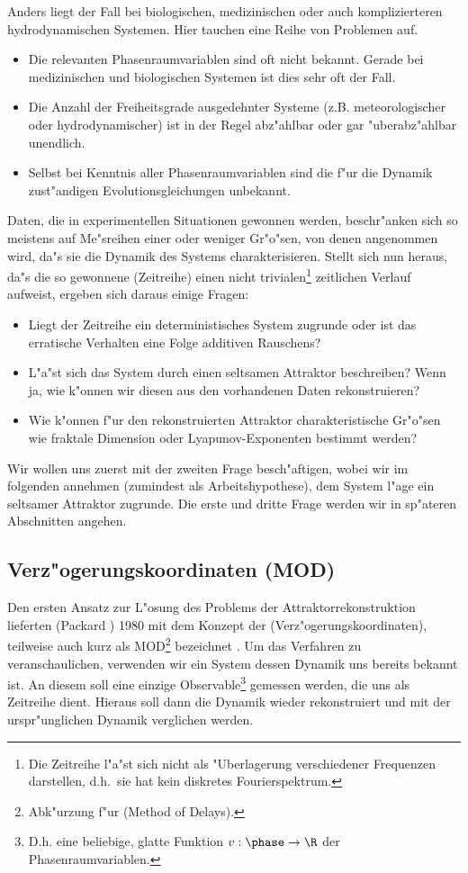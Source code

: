 Anders liegt der Fall bei biologischen, medizinischen oder auch komplizierteren
hydrodynamischen Systemen. Hier tauchen eine Reihe von Problemen auf.
\begin{itemize}
\item Die relevanten Phasenraumvariablen sind oft nicht bekannt. Gerade bei
medizinischen und biologischen Systemen ist dies sehr oft der Fall.
\item Die Anzahl der Freiheitsgrade ausgedehnter Systeme (z.B. meteorologischer oder
hydrodynamischer) ist in der Regel abz"ahlbar oder gar "uberabz"ahlbar unendlich. 
\item Selbst bei Kenntnis aller Phasenraumvariablen sind die f"ur die Dynamik zust"andigen
Evolutionsgleichungen unbekannt.
\end{itemize}
Daten, die in experimentellen Situationen gewonnen werden, beschr"anken sich so meistens
auf Me"sreihen einer oder weniger Gr"o"sen, von denen angenommen wird, da"s  sie die
Dynamik des Systems charakterisieren. Stellt sich nun heraus, da"s die so gewonnene
\begriff(Zeitreihe) einen nicht trivialen\footnote{Die Zeitreihe l"a"st sich nicht als
"Uberlagerung verschiedener Frequenzen darstellen, d.h.\ sie hat kein diskretes
Fourierspektrum.} zeitlichen Verlauf aufweist, ergeben sich daraus einige Fragen:
\begin{itemize}
\item Liegt der Zeitreihe ein deterministisches System zugrunde oder ist das erratische
Verhalten eine Folge additiven Rauschens?
\item L"a"st sich das System durch einen seltsamen Attraktor beschreiben? Wenn ja, wie
k"onnen wir diesen aus den vorhandenen Daten rekonstruieren?
\item Wie k"onnen f"ur den rekonstruierten Attraktor charakteristische Gr"o"sen wie
fraktale Dimension oder Lyapunov-Exponenten bestimmt werden?
\end{itemize}
Wir wollen uns zuerst mit der zweiten Frage besch"aftigen, wobei wir im folgenden annehmen
(zumindest als Arbeitshypothese), dem System l"age ein seltsamer Attraktor zugrunde.
Die erste und dritte Frage werden wir in sp"ateren Abschnitten angehen.

\subsection{Verz"ogerungskoordinaten (MOD)}

Den ersten Ansatz zur L"osung des Problems der Attraktorrekonstruktion  lieferten
\linebreak \autor(Packard \etal) 1980
mit dem Konzept der \begriff(Verz"ogerungskoordinaten), teilweise auch kurz als
MOD\footnote{Abk"urzung f"ur \begriff(Method of Delays).} bezeichnet \cite{packard80}. Um das Verfahren 
zu veranschaulichen, verwenden wir ein System dessen Dynamik uns bereits bekannt ist. An
diesem soll eine einzige Observable\footnote{D.h. eine beliebige, glatte Funktion
$v:\phase\to\R$ der Phasenraumvariablen.} gemessen werden, die uns als Zeitreihe
dient. Hieraus soll dann die Dynamik wieder rekonstruiert und mit der urspr"unglichen Dynamik
verglichen werden.

